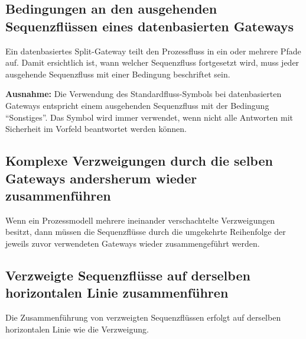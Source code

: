 \documentclass[12pt,report]{../../Templates/snetTeaching}
\begin{document}
\pagebreak[4]
\subsection{Bedingungen an den ausgehenden Sequenzflüssen eines datenbasierten Gateways}

Ein datenbasiertes Split-Gateway teilt den Prozessfluss in ein oder mehrere Pfade auf. Damit ersichtlich ist, wann welcher Sequenzfluss fortgesetzt wird, muss jeder ausgehende Sequenzfluss mit einer Bedingung beschriftet sein.

\textbf{Ausnahme:} Die Verwendung des Standardfluss-Symbols bei datenbasierten Gateways entspricht einem ausgehenden Sequenzfluss mit der Bedingung "`Sonstiges"'. Das Symbol wird immer verwendet, wenn nicht alle Antworten mit Sicherheit im Vorfeld beantwortet werden können. 


\begin{Rahmen}
	\hfill
\end{Rahmen}


\subsection{Komplexe Verzweigungen durch die selben Gateways andersherum wieder zusammenführen}
\label{sec:gwGleichSchliessen}

Wenn ein Prozessmodell mehrere ineinander verschachtelte Verzweigungen besitzt, dann müssen die Sequenzflüsse durch die umgekehrte Reihenfolge der jeweils zuvor verwendeten Gateways wieder zusammengeführt werden.


\begin{Rahmen}
	\hfill
\end{Rahmen}


\clearpage
\subsection{Verzweigte Sequenzflüsse auf derselben horizontalen Linie zusammenführen}

Die Zusammenführung von verzweigten Sequenzflüssen erfolgt auf derselben horizontalen Linie wie die Verzweigung.


\begin{Rahmen}
	\hfill
\end{Rahmen}
\end{document}

